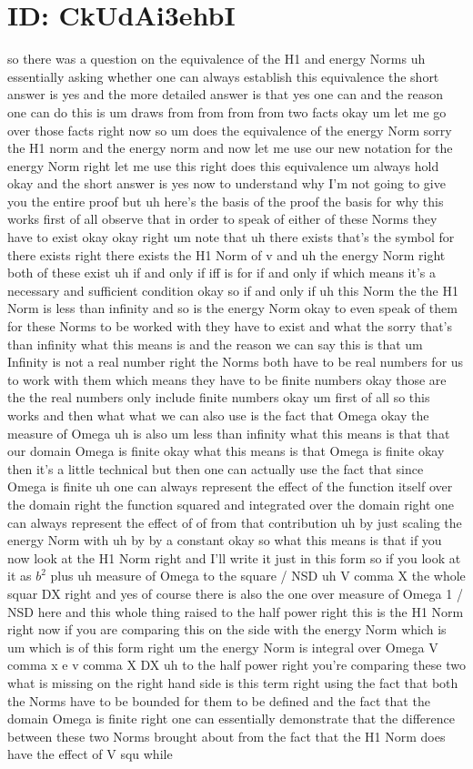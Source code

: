 \documentclass[10pt]{article}
\begin{document}
{\section*{ID: CkUdAi3ehbI}
so there was a question on the equivalence of the H1 and energy Norms uh essentially asking whether one can always establish this equivalence the short answer is yes and the more detailed answer is that yes one can and the reason one can do this is um draws from from from from two facts okay um let me go over those facts right now so um does the equivalence of the energy Norm sorry the H1 norm and the energy norm and now let me use our new notation for the energy Norm right let me use this right does this equivalence um always hold okay and the short answer is yes now to understand why I'm not going to give you the entire proof but uh here's the basis of the proof the basis for why this works first of all observe that in order to speak of either of these Norms they have to exist okay okay right um note that uh there exists that's the symbol for there exists right there exists the H1 Norm of v and uh the energy Norm right both of these exist uh if and only if iff is for if and only if which means it's a necessary and sufficient condition okay so if and only if uh this Norm the the H1 Norm is less than infinity and so is the energy Norm okay to even speak of them for these Norms to be worked with they have to exist and what the sorry that's than infinity what this means is and the reason we can say this is that um Infinity is not a real number right the Norms both have to be real numbers for us to work with them which means they have to be finite numbers okay those are the the real numbers only include finite numbers okay um first of all so this works and then what what we can also use is the fact that Omega okay the measure of Omega uh is also um less than infinity what this means is that that our domain Omega is finite okay what this means is that Omega is finite okay then it's a little technical but then one can actually use the fact that since Omega is finite uh one can always represent the effect of the function itself over the domain right the function squared and integrated over the domain right one can always represent the effect of of from that contribution uh by just scaling the energy Norm with uh by by a constant okay so what this means is that if you now look at the H1 Norm right and I'll write it just in this form so if you look at it as $b^2$ plus uh measure of Omega to the square / NSD uh V comma X the whole squar DX right and yes of course there is also the one over measure of Omega 1 / NSD here and this whole thing raised to the half power right this is the H1 Norm right now if you are comparing this on the side with the energy Norm which is um which is of this form right um the energy Norm is integral over Omega V comma x e v comma X DX uh to the half power right you're comparing these two what is missing on the right hand side is this term right using the fact that both the Norms have to be bounded for them to be defined and the fact that the domain Omega is finite right one can essentially demonstrate that the difference between these two Norms brought about from the fact that the H1 Norm does have the effect of V squ while }
\end{document}
